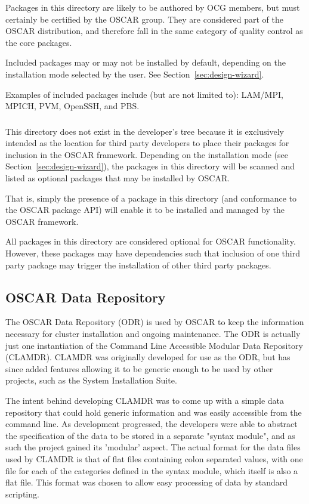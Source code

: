 Packages in this directory are likely to be authored by OCG members,
but must certainly be certified by the OSCAR group.  They are
considered part of the OSCAR distribution, and therefore fall in the
same category of quality control as the core packages.

Included packages may or may not be installed by default, depending on
the installation mode selected by the user.  See
Section~\ref{sec:design-wizard}.

Examples of included packages include (but are not limited to):
LAM/MPI, MPICH, PVM, OpenSSH, and PBS.

\subsubsection{}

This directory does not exist in the developer's tree because it is
exclusively intended as the location for third party developers to
place their packages for inclusion in the OSCAR framework.  Depending
on the installation mode (see Section~\ref{sec:design-wizard}), the
packages in this directory will be scanned and listed as optional
packages that may be installed by OSCAR.

That is, simply the presence of a package in this directory (and
conformance to the OSCAR package API) will enable it to be installed
and managed by the OSCAR framework.  

All packages in this directory are considered optional for OSCAR
functionality.  However, these packages may have dependencies such
that inclusion of one third party package may trigger the installation
of other third party packages.

\subsection{OSCAR Data Repository}

The OSCAR Data Repository (ODR) is used by OSCAR to keep the
information necessary for cluster installation and ongoing
maintenance. The ODR is actually just one instantiation of the Command
Line Accessible Modular Data Repository (CLAMDR). CLAMDR was
originally developed for use as the ODR, but has since added features
allowing it to be generic enough to be used by other projects, such as
the System Installation Suite.

The intent behind developing CLAMDR was to come up with a simple data
repository that could hold generic information and was easily
accessible from the command line. As development progressed, the
developers were able to abstract the specification of the data to be
stored in a separate "syntax module", and as such the project gained
its 'modular' aspect. The actual format for the data files used by
CLAMDR is that of flat files containing colon separated values, with
one file for each of the categories defined in the syntax module,
which itself is also a flat file.  This format was chosen to allow
easy processing of data by standard scripting.

